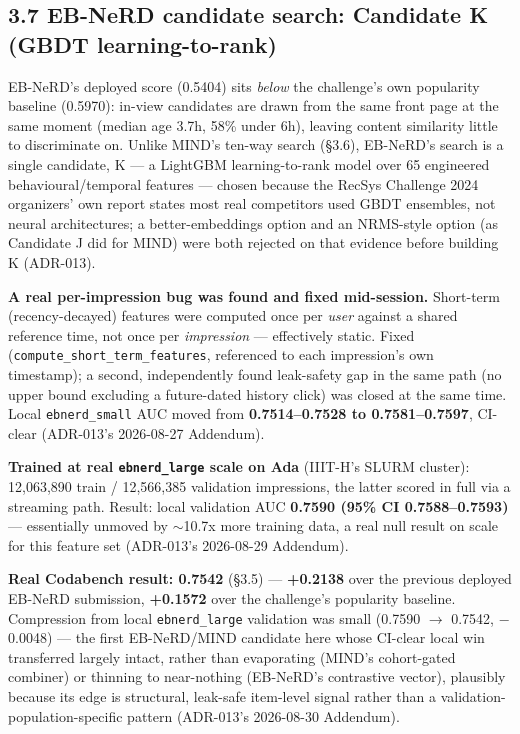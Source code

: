 \documentclass[10.5pt]{article}
\begin{document}
\subsection*{3.7 EB-NeRD candidate search: Candidate K (GBDT learning-to-rank)}

EB-NeRD's deployed score (0.5404) sits \emph{below} the challenge's own
popularity baseline (0.5970): in-view candidates are drawn from the same
front page at the same moment (median age 3.7h, 58\% under 6h), leaving
content similarity little to discriminate on. Unlike MIND's ten-way search
(\S3.6), EB-NeRD's search is a single candidate, K --- a LightGBM
learning-to-rank model over 65 engineered behavioural/temporal features
--- chosen because the RecSys Challenge 2024 organizers' own report states
most real competitors used GBDT ensembles, not neural architectures; a
better-embeddings option and an NRMS-style option (as Candidate J did for
MIND) were both rejected on that evidence before building K (ADR-013).

\begin{sloppypar}
\textbf{A real per-impression bug was found and fixed mid-session.}
Short-term (recency-decayed) features were computed once per \emph{user}
against a shared reference time, not once per \emph{impression} ---
effectively static. Fixed (\texttt{compute\_short\_term\_features},
referenced to each impression's own timestamp); a second, independently
found leak-safety gap in the same path (no upper bound excluding a
future-dated history click) was closed at the same time. Local
\texttt{ebnerd\_small} AUC moved from \textbf{0.7514--0.7528 to
0.7581--0.7597}, CI-clear (ADR-013's 2026-08-27 Addendum).
\end{sloppypar}

\textbf{Trained at real \texttt{ebnerd\_large} scale on Ada} (IIIT-H's
SLURM cluster): 12{,}063{,}890 train / 12{,}566{,}385 validation
impressions, the latter scored in full via a streaming path. Result: local
validation AUC \textbf{0.7590 (95\% CI 0.7588--0.7593)} --- essentially
unmoved by $\sim$10.7x more training data, a real null result on scale for
this feature set (ADR-013's 2026-08-29 Addendum).

\textbf{Real Codabench result: 0.7542} (\S3.5) --- \textbf{+0.2138} over
the previous deployed EB-NeRD submission, \textbf{+0.1572} over the
challenge's popularity baseline. Compression from local
\texttt{ebnerd\_large} validation was small (0.7590 $\to$ 0.7542,
$-$0.0048) --- the first EB-NeRD/MIND candidate here whose CI-clear local
win transferred largely intact, rather than evaporating (MIND's
cohort-gated combiner) or thinning to near-nothing (EB-NeRD's contrastive
vector), plausibly because its edge is structural, leak-safe item-level
signal rather than a validation-population-specific pattern (ADR-013's
2026-08-30 Addendum).
\end{document}

